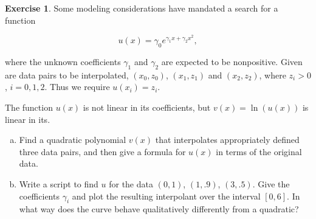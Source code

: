 \documentclass[12pt,a4]{article}
\theoremstyle{definition}
\newtheorem{exercise}{Exercise}
\begin{document}
\begin{exercise}
	Some modeling considerations have mandated a search for a function 
	
	\[
	u(x) = \gamma_0 e^{\gamma_1 x + \gamma_2 x^2} {,}
	\]
	
	\noindent where the unknown coefficients $\gamma_1$ and $\gamma_2$ are expected to be nonpositive. Given are data pairs to be interpolated, $(x_0, z_0)$, $(x_1, z_1)$ and $(x_2, z_2)$, where $z_i > 0$, $i = 0, 1, 2$. Thus we require $u(x_i) = z_i$. 
	
	The function $u(x)$ is not linear in its coefficients, but $v(x) = \ln(u(x))$ is linear in its. 
	
	\begin{enumerate}[(a)]
		\item Find a quadratic polynomial $v(x)$ that interpolates appropriately defined three data pairs, and then give a formula for $u(x)$ in terms of the original data. 
		
		\item Write a script to find $u$ for the data $(0, 1)$, $(1, .9)$, $(3, .5)$. Give the coefficients $\gamma_i$ and plot the resulting interpolant over the interval $[0, 6]$. In what way does the curve behave qualitatively differently from a quadratic?
	\end{enumerate}
\end{exercise}
\end{document}
